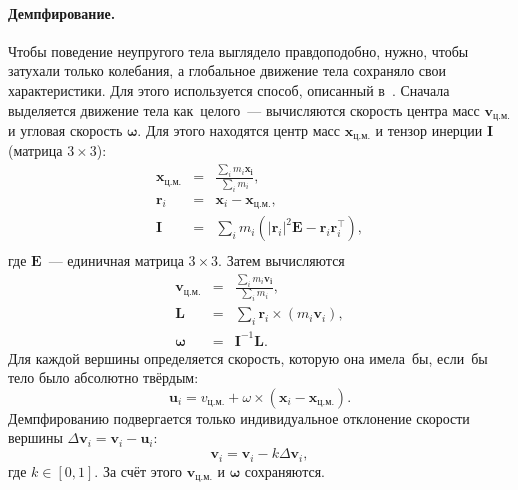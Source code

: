 \documentclass[a4paper, 12pt, titlepage]{extarticle}
\newcommand{\vect}[1]{\mathbf{#1}} %
\newcommand{\matx}[1]{\mathbf{#1}} %
\newcommand{\transposed}{\top} %
\begin{document}
\begin{original}
        \paragraph{Демпфирование.} Чтобы поведение неупругого тела выглядело правдоподобно,
        нужно, чтобы затухали только колебания, а глобальное движение тела сохраняло свои характеристики.
        Для этого используется способ, описанный в~\cite[подраздел~3.5]{mueller-position-dynamics}. Сначала выделяется
        движение тела как~целого~--- вычисляются скорость центра масс $\vect{v}_{ц.м.}$ и угловая
        скорость $\vect{\omega}$. Для этого находятся центр масс
        $\vect{x}_{ц.м.}$ и тензор инерции $\matx I$ (матрица $3 \times 3$):
        \begin{eqnarray*}
          \vect{x}_{ц.м.} & = & \frac{\sum_i m_i \vect{x_i}}{\sum_i m_i},\\
          \vect{r}_i      & = & \vect{x}_i - \vect{x}_{ц.м.},\\
          \matx{I}        & = & \sum_i m_i ( |\vect{r}_i|^2 \matx E - \vect{r}_i \vect{r}_i^\transposed),\\
        \end{eqnarray*}
        где $\matx E$~--- единичная матрица $3 \times 3$. Затем вычисляются
        \begin{eqnarray*}
          \vect{v}_{ц.м.} & = & \frac{\sum_i m_i \vect{v_i}}{\sum_i m_i},\\
          \vect{L}        & = & \sum_i \vect{r}_i \times (m_i \vect{v}_i),\\
          \vect{\omega}   & = & \matx{I}^{-1} \vect{L}.
        \end{eqnarray*}
        Для каждой вершины определяется скорость,
        которую она имела~бы, если~бы тело было абсолютно твёрдым:
        \begin{equation}
          \vect{u}_i = v_{ц.м.} + \omega \times (\vect{x}_i - \vect{x}_{ц.м.}).
        \end{equation}
        Демпфированию подвергается только индивидуальное отклонение скорости вершины
        $\Delta \vect{v}_i = \vect{v}_i - \vect{u}_i$:
        \begin{equation}
          \vect{v}_i = \vect{v}_i - k \Delta \vect{v}_i,
        \end{equation}
        где $k \in [0, 1]$. За счёт этого $\vect{v}_{ц.м.}$ и $\vect{\omega}$ сохраняются.
\end{original}
\end{document}
